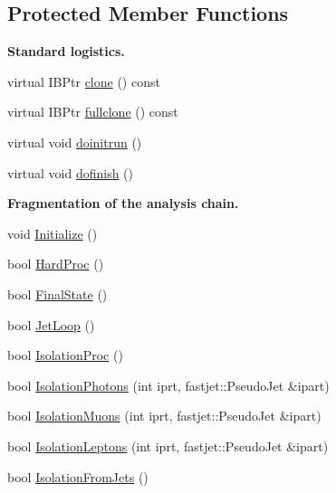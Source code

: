 \subsection*{Protected Member Functions}
\begin{Indent}{\bf Standard logistics.}\par
\begin{DoxyCompactItemize}
\item 
virtual I\+B\+Ptr \hyperlink{class_herwig_1_1_herwig_tree_a942f95b5dbcd02b014541a79f8fa5eb3}{clone} () const 
\item 
virtual I\+B\+Ptr \hyperlink{class_herwig_1_1_herwig_tree_a380c78ab7f8c7486d9a356ab4af2fa87}{fullclone} () const 
\item 
virtual void \hyperlink{class_herwig_1_1_herwig_tree_ad6dce6737790c0e08f0f74b304f875ad}{doinitrun} ()
\item 
virtual void \hyperlink{class_herwig_1_1_herwig_tree_aa520a60f4bd7dc79f514eb03156cbb5b}{dofinish} ()
\end{DoxyCompactItemize}
\end{Indent}
\begin{Indent}{\bf Fragmentation of the analysis chain.}\par
\begin{DoxyCompactItemize}
\item 
void \hyperlink{class_herwig_1_1_herwig_tree_a15241d3c3022e5adc42b6d14a58db793}{Initialize} ()
\item 
bool \hyperlink{class_herwig_1_1_herwig_tree_aaff97a85da1095113b8a9c9cea55f504}{Hard\+Proc} ()
\item 
bool \hyperlink{class_herwig_1_1_herwig_tree_abecfba3d8edb2d977782e980fdf5cdd5}{Final\+State} ()
\item 
bool \hyperlink{class_herwig_1_1_herwig_tree_a5841f99ecb35a9eedf9c87e8c217cd63}{Jet\+Loop} ()
\item 
bool \hyperlink{class_herwig_1_1_herwig_tree_a5c00e67d9cfde9db3b3f78a1d71fc43b}{Isolation\+Proc} ()
\item 
bool \hyperlink{class_herwig_1_1_herwig_tree_aff911b963152c83b2825f7d2f7ca6817}{Isolation\+Photons} (int iprt, fastjet\+::\+Pseudo\+Jet \&ipart)
\item 
bool \hyperlink{class_herwig_1_1_herwig_tree_af5641afa4dfabbd045e5e79b3ffe6bdb}{Isolation\+Muons} (int iprt, fastjet\+::\+Pseudo\+Jet \&ipart)
\item 
bool \hyperlink{class_herwig_1_1_herwig_tree_a150ce42e768874f6769f0dfca78865a2}{Isolation\+Leptons} (int iprt, fastjet\+::\+Pseudo\+Jet \&ipart)
\item 
bool \hyperlink{class_herwig_1_1_herwig_tree_a2151de137082d50455c75409d0ea3901}{Isolation\+From\+Jets} ()
\end{DoxyCompactItemize}
\end{Indent}

